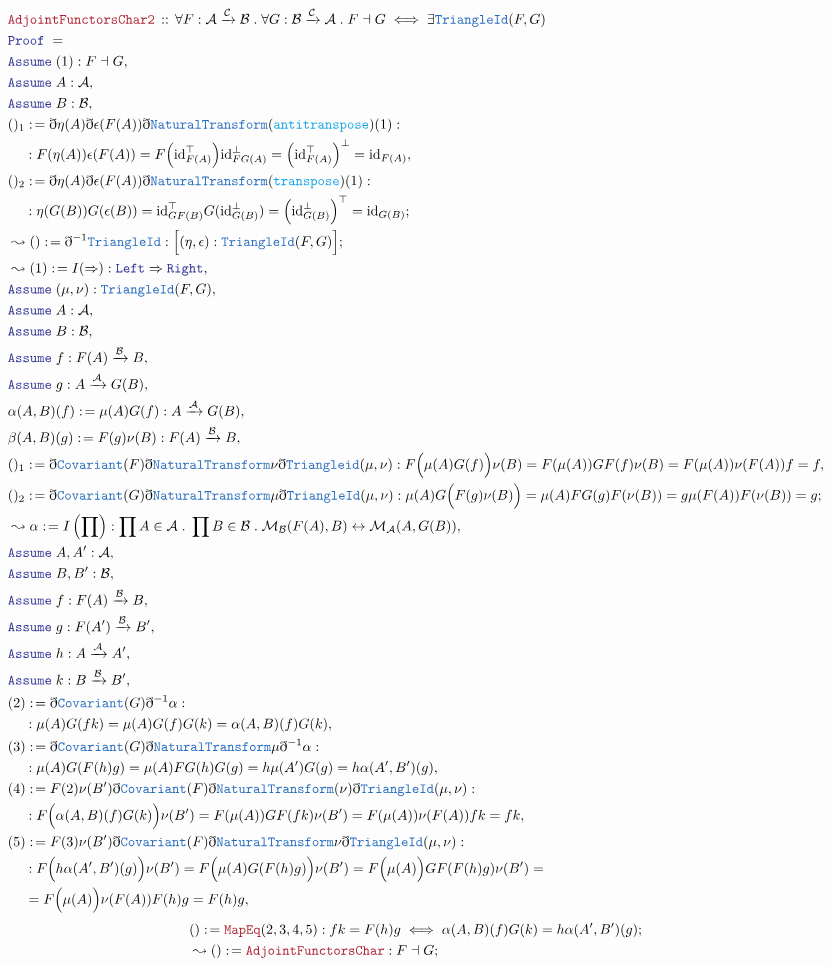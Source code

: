 \documentclass[12pt]{scrartcl}
\newcommand{\TYPE}[1]{\textcolor{NavyBlue}{\mathtt{#1}}}
\newcommand{\FUNC}[1]{\textcolor{Cerulean}{\mathtt{#1}}}
\newcommand{\LOGIC}[1]{\textcolor{Blue}{\mathtt{#1}}}
\newcommand{\THM}[1]{\textcolor{Maroon}{\mathtt{#1}}}
\renewcommand{\.}{\; . \;}
\newcommand{\de}{: \kern 0.1pc =}
\newcommand{\Theorem}[2]{& \THM{#1} \, :: \, #2 \\ & \Proof = \\ }
\newcommand{\NewLine}{\\ & \kern 1pc}
\newcommand{\Page}[1]{ \begin{align*} #1 \end{align*}   }
\newcommand{ \bd }{ \ByDef }
\DeclareMathOperator*{\id}{id}
\newcommand{\Mor}{\mathcal{M}}
\newcommand{\ToBij}{\leftrightarrow}
\newcommand{\Arrow}{\xrightarrow}
\newcommand{\Say}[3]{& #1 \de #2 : #3, \\}
\newcommand{\Conclude}[3]{& #1 \de #2 : #3; \\}
\newcommand{\Derive}[3]{& \leadsto #1 \de #2 : #3, \\}
\newcommand{\DeriveConclude}[3]{& \leadsto #1 \de #2 : #3 ; \\}
\newcommand{\Assume}[2]{& \LOGIC{Assume} \; #1 : #2, \\}
\newcommand{\ByDef}{\eth}
\newcommand{\Proof}{\LOGIC{Proof} \; }
\newcommand{\Cov}{\TYPE{Covariant}}
\newcommand{\NT}{\TYPE{NaturalTransform}}
\newcommand{\C}{\mathcal{C}}
\newcommand{\A}{\mathcal{A}}
\newcommand{\B}{\mathcal{B}}
\begin{document}
\Page{
	\Theorem{AdjointFunctorsChar2}
	{\forall F : \A \Arrow{\C} \B \. \forall G : \B \Arrow{\C} \A \. F \dashv G \iff \exists \TYPE{TriangleId}(F,G)}
	\Assume{(1)}{F \dashv G}
	\Assume{A}{\A}
	\Assume{B}{\B}
	\Say{()_1}{  \bd \eta(A) \bd \epsilon(F(A))\bd \NT(\FUNC{antitranspose}) (1)  }{
		\NewLine :
		F(\eta(A))\epsilon(F(A)) = 
		F\Big({\id}_{F(A)}^\top\Big){\id}_{FG(A)}^\bot =
		\Big(   {\id}_{F(A)}^\top \Big)^\bot = 
		{\id}_{F(A)}
	}
	\Conclude{()_2}{\bd \eta(A) \bd \epsilon(F(A)) \bd \NT (\FUNC{transpose})(1)}{   
		\NewLine :
		\eta(G(B))G(\epsilon(B)) =   
		{\id}_{GF(B)}^\top G( {\id}_{G(B)}^\bot) =
		\Big(  {\id}_{G(B)}^\bot \Big)^\top = 
		{\id}_{G(B)}
	}
	\DeriveConclude{()}{\bd^{-1} \TYPE{TriangleId}}{ \Big[  (\eta,\epsilon) : \TYPE{TriangleId}(F,G) \Big]    }
	\Derive{(1)}{I(\Rightarrow)}{\LOGIC{Left} \Rightarrow \LOGIC{Right}}
	\Assume{(\mu,\nu)}{\TYPE{TriangleId}(F,G)}
	\Assume{A}{\A}
	\Assume{B}{\B}
	\Assume{f}{F(A) \Arrow{\B} B}
	\Assume{g}{A \Arrow{\A} G(B)}
	\Say{\alpha(A,B)(f)}{  \mu(A)G(f) }{ A \Arrow{\A} G(B) }
	\Say{ \beta(A,B)(g)}{  F(g)\nu(B) }{ F(A) \Arrow{\B} B    }
	\Say{()_1}{ \bd \Cov(F) \bd \NT \nu \bd \TYPE{Triangleid}(\mu,\nu)}{  
			F\Big(\mu(A)G(f)\Big) \nu(B)  =
			F(\mu(A))GF(f) \nu(B) =
			F(\mu(A))\nu(F(A))f =
			f
		}
	\Conclude{()_2}{ \bd \Cov(G) \bd \NT \mu \bd \TYPE{TriangleId}(\mu,\nu)}{  
			\mu(A)G\Big(  F(g)\nu(B) \Big) =
			\mu(A) FG(g)F(\nu(B)) =
			g \mu(F(A))F(\nu(B)) =
			g
		}
	\Derive{\alpha }{I\left(\prod\right) }{ \prod A \in \A \. \prod B \in \B \. \Mor_{\B}(F(A),B) \ToBij \Mor_{\A}(A,G(B))}
	\Assume{A,A'}{\A}
	\Assume{B,B'}{\B}
	\Assume{f}{F(A) \Arrow{\B} B}
	\Assume{g}{F(A') \Arrow{\B} B'}
	\Assume{h}{A \Arrow{\A} A'}
	\Assume{k}{B \Arrow{\B} B'}
	\Say{(2)}{\bd\Cov(G)\bd^{-1} \alpha }{\NewLine : \mu(A)G(fk) = \mu(A)G(f)G(k) = \alpha(A,B)(f)G(k)}
	\Say{(3)}{ \bd \Cov(G) \bd \NT \mu \bd^{-1} \alpha  }
	{  \NewLine : \mu(A)G(F(h)g) =   \mu(A)FG(h)G(g)   = h \mu(A')G(g) =  h \alpha(A',B')(g)   }
	\Say{(4)}{ F(2)\nu(B') \bd \Cov(F) \bd \NT (\nu) \bd \TYPE{TriangleId}(\mu,\nu)  }
	{  \NewLine : F\Big(\alpha(A,B)(f)G(k)\Big)\nu(B')  = F(\mu(A))GF(fk)\nu(B') = F(\mu(A))\nu(F(A))fk = fk}
	\Say{(5)}{F(3)\nu(B')\bd \Cov(F) \bd \NT \nu \bd \TYPE{TriangleId}(\mu,\nu)}
	{ 
		\NewLine :
		F\Big( h \alpha(A',B')(g) \Big) \nu(B') = 
		F\Big( \mu(A)G(F(h)g) \Big) \nu(B') =
		F\Big( \mu(A) \Big) GF(F(h)g) \nu(B') = \NewLine =
		F\Big( \mu(A) \Big) \nu(F(A)) F(h)g  =
		F(h)g
	}
}\Page{ 
	\Conclude{ () }{ \THM{MapEq}(2,3,4,5)   }{  fk = F(h)g \iff \alpha(A,B)(f)G(k) = h \alpha(A',B')(g)    }
	\DeriveConclude{()}{\THM{AdjointFunctorsChar}}{F \dashv G}
}
\end{document}
